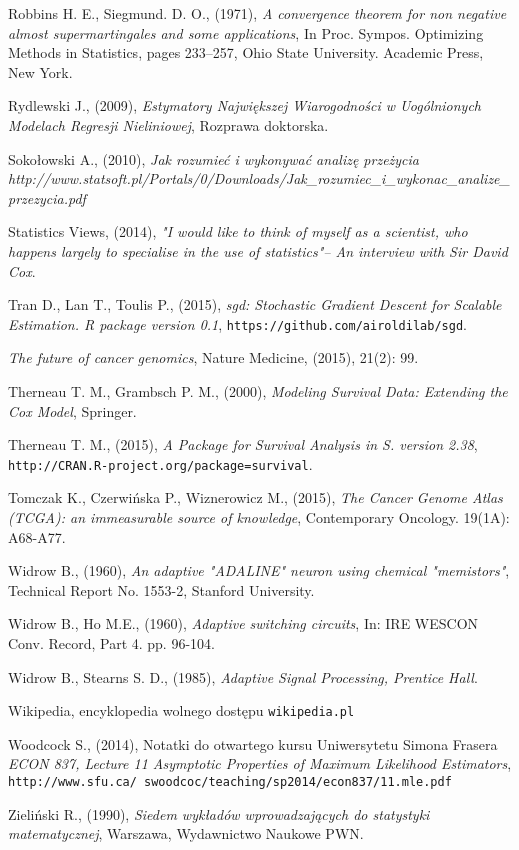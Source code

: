 \begin{thebibliography}{99}
 Robbins H. E., Siegmund. D. O., (1971), \textit{A convergence theorem for non negative almost supermartingales and some applications}, In Proc. Sympos. Optimizing Methods in Statistics, pages 233–257, Ohio State
University. Academic Press, New York.

 Rydlewski J., (2009), \textit{Estymatory Największej Wiarogodności w Uogólnionych Modelach Regresji Nieliniowej}, Rozprawa doktorska.

 Sokołowski A., (2010), \textit{Jak rozumieć i wykonywać analizę przeżycia} \textit{http://www.statsoft.pl/Portals/0/Downloads/Jak\_rozumiec\_i\_wykonac\_analize\_przezycia.pdf}

 Statistics Views, (2014), \textit{ "I would like to think of myself as a scientist, who happens largely to specialise in the use of statistics"– An interview with Sir David Cox}. 

 Tran D., Lan T., Toulis P., (2015), \textit{sgd: Stochastic Gradient Descent for Scalable Estimation. R package version 0.1}, \texttt{https://github.com/airoldilab/sgd}.


 \textit{The future of cancer genomics}, Nature Medicine, (2015), 21(2): 99.

 Therneau T. M., Grambsch P. M., (2000), \textit{Modeling Survival Data: Extending the Cox Model}, Springer.

 Therneau T. M., (2015), \textit{A Package for Survival Analysis in S. version 2.38}, \texttt{http://CRAN.R-project.org/package=survival}.


 Tomczak K., Czerwińska P., Wiznerowicz M., (2015), \textit{The Cancer Genome Atlas (TCGA): an immeasurable source of knowledge}, Contemporary Oncology. 19(1A): A68-A77.

 Widrow B., (1960), \textit{An adaptive "ADALINE" neuron using chemical "memistors"}, Technical Report No. 1553-2, Stanford University.

 Widrow B., Ho M.E., (1960), \textit{Adaptive switching circuits}, In: IRE WESCON Conv.
Record, Part 4. pp. 96-104.

 Widrow B., Stearns S. D., (1985), \textit{Adaptive Signal Processing, Prentice Hall}.

 Wikipedia, encyklopedia wolnego dostępu \texttt{wikipedia.pl}
 
  Woodcock S., (2014), Notatki do otwartego kursu Uniwersytetu Simona Frasera \textit{ECON 837, Lecture 11 Asymptotic Properties of Maximum Likelihood Estimators}, \\ \texttt{http://www.sfu.ca/~swoodcoc/teaching/sp2014/econ837/11.mle.pdf}
 
 Zieliński R., (1990), \textit{Siedem wykładów wprowadzających do statystyki matematycznej}, Warszawa, Wydawnictwo Naukowe PWN.


\end{thebibliography}